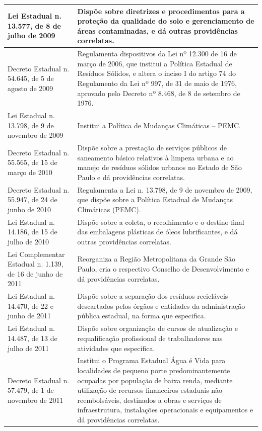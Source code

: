 \begin{center}
\begin{longtable}{|p{}|p{}|}
			\hline
			Lei Estadual n. 13.577, de 8 de julho de 2009 & Dispõe sobre diretrizes e procedimentos para a proteção da qualidade do solo e gerenciamento de áreas contaminadas, e dá outras providências correlatas. \\
			\hline
			Decreto Estadual n. 54.645, de 5 de agosto de 2009 & Regulamenta dispositivos da Lei nº 12.300 de 16 de março de 2006, que institui a  Política  Estadual  de  Resíduos  Sólidos,  e  altera  o  inciso  I  do  artigo  74  do Regulamento da Lei nº 997, de 31 de maio de 1976, aprovado pelo Decreto nº 8.468, de 8 de setembro de 1976. \\
			\hline
			Lei Estadual n. 13.798, de 9 de novembro de 2009 & Institui a Política de Mudanças Climáticas – PEMC. \\
			\hline
			Decreto Estadual n. 55.565, de 15 de março de 2010 & Dispõe sobre a prestação de serviços públicos de saneamento básico relativos à limpeza  urbana  e  ao  manejo  de  resíduos  sólidos  urbanos  no  Estado  de  São Paulo e dá providências correlatas. \\
			\hline
			Decreto Estadual n. 55.947, de 24 de junho de 2010 & Regulamenta a Lei n. 13.798, de 9 de novembro de 2009, que dispõe sobre a Política Estadual de Mudanças Climáticas (PEMC). \\
			\hline
			Lei  Estadual  n.  14.186,  de  15 de julho de 2010 & Dispõe sobre a coleta, o recolhimento e o destino final das embalagens plásticas de óleos lubrificantes, e dá outras providências correlatas. \\
			\hline
			Lei Complementar Estadual n. 1.139, de 16 de junho de 2011 & Reorganiza  a  Região  Metropolitana  da  Grande  São  Paulo,  cria  o  respectivo Conselho de Desenvolvimento e dá providências correlatas. \\
			\hline
			Lei Estadual n. 14.470, de 22 e junho de 2011 & Dispõe sobre a separação dos resíduos recicláveis descartados pelos órgãos e entidades da administração pública estadual, na forma que especifica. \\
			\hline
			Lei  Estadual  n.  14.487,  de  13 de julho de 2011 & Dispõe sobre organização de cursos de atualização e requalificação profissional de trabalhadores nas atividades que especifica. \\
			\hline
			Decreto Estadual n. 57.479, de 1 de novembro de 2011 & Institui  o  Programa  Estadual  Água  é  Vida  para  localidades  de  pequeno  porte predominantemente   ocupadas   por   população   de   baixa   renda,   mediante utilização  de  recursos  financeiros  estaduais  não  reembolsáveis,  destinados  a obras  e  serviços  de  infraestrutura, instalações  operacionais  e  equipamentos  e dá providências correlatas. \\

\end{longtable}
\end{center}
